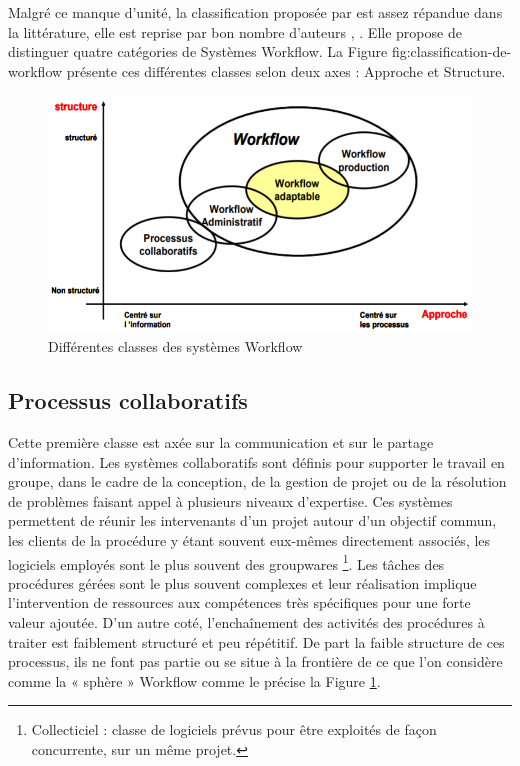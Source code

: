 Malgré ce manque d’unité, la classification proposée par \parencite{McReady} est assez répandue dans la littérature, elle est reprise par bon nombre d’auteurs \parencite{VanderAalst},
\parencite{Georgakopoulos}. Elle propose de distinguer quatre catégories de Systèmes Workflow. La Figure fig:classification-de-workflow présente ces différentes classes selon deux axes : Approche et Structure.

\begin{figure}[h]
	\centering
	\includegraphics[width=0.7\linewidth]{"images/classification de workflow"}
	\caption{ Différentes classes des systèmes Workflow 
}
	\label{fig:classification-de-workflow}
\end{figure}


\subsection{Processus collaboratifs }
Cette première classe est axée sur la communication et sur le partage d’information. Les systèmes collaboratifs sont définis pour supporter le travail en groupe, dans le cadre de la conception, de la gestion de projet ou de la résolution de problèmes faisant appel à plusieurs niveaux d’expertise. Ces systèmes permettent de réunir les intervenants d’un projet autour d’un objectif commun, les clients de la procédure y étant souvent eux-mêmes directement associés, les logiciels employés sont le plus souvent des groupwares
\footnote[1]{\samepage  Collecticiel : classe de logiciels prévus pour être exploités de façon concurrente, sur un même projet.}. Les tâches des procédures gérées sont le plus souvent complexes et leur réalisation implique l’intervention de ressources aux compétences très spécifiques pour une forte valeur ajoutée. D’un autre coté, l’enchaînement des activités des procédures à traiter est faiblement structuré et peu répétitif.
De part la faible structure de ces processus, ils ne font pas partie ou se situe à la frontière de ce que l’on considère comme la « sphère » Workflow comme le précise la Figure \ref{fig:classification-de-workflow}. 

